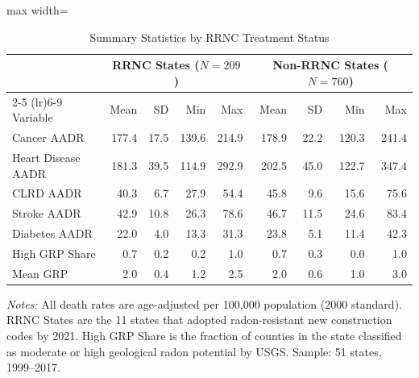 \begin{table}[H]
\centering
\caption{Summary Statistics by RRNC Treatment Status}
\begin{threeparttable}
\begin{adjustbox}{max width=\textwidth}
\begin{tabular}{l rrrr rrrr}
\toprule
 & \multicolumn{4}{c}{RRNC States ($N=209$)} & \multicolumn{4}{c}{Non-RRNC States ($N=760$)} \\
\cmidrule(lr){2-5} \cmidrule(lr){6-9}
Variable & Mean & SD & Min & Max & Mean & SD & Min & Max \\
\midrule
Cancer AADR & 177.4 & 17.5 & 139.6 & 214.9 & 178.9 & 22.2 & 120.3 & 241.4 \\
Heart Disease AADR & 181.3 & 39.5 & 114.9 & 292.9 & 202.5 & 45.0 & 122.7 & 347.4 \\
CLRD AADR & 40.3 & 6.7 & 27.9 & 54.4 & 45.8 & 9.6 & 15.6 & 75.6 \\
Stroke AADR & 42.9 & 10.8 & 26.3 & 78.6 & 46.7 & 11.5 & 24.6 & 83.4 \\
Diabetes AADR & 22.0 & 4.0 & 13.3 & 31.3 & 23.8 & 5.1 & 11.4 & 42.3 \\
High GRP Share & 0.7 & 0.2 & 0.2 & 1.0 & 0.7 & 0.3 & 0.0 & 1.0 \\
Mean GRP & 2.0 & 0.4 & 1.2 & 2.5 & 2.0 & 0.6 & 1.0 & 3.0 \\
\bottomrule
\end{tabular}
\end{adjustbox}
\begin{tablenotes}[flushleft]
\small
\item \textit{Notes:} All death rates are age-adjusted per 100,000 population (2000 standard). RRNC States are the 11 states that adopted radon-resistant new construction codes by 2021. High GRP Share is the fraction of counties in the state classified as moderate or high geological radon potential by USGS. Sample: 51 states, 1999--2017.
\end{tablenotes}
\end{threeparttable}
\label{tab:summary}
\end{table}
